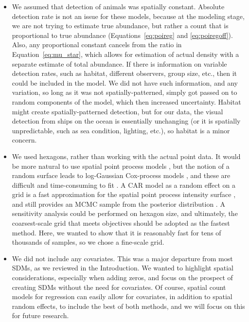 \documentclass[11pt, titlepage]{article}
\begin{document}
\begin{spacing}{1.9}
\begin{flushleft}
\begin{itemize}
  \item We assumed that detection of animals was spatially constant.  Absolute detection rate is not an issue for these models, because at the modeling stage, we are not trying to estimate true abundance, but rather a count that is proportional to true abundance (Equations~\eqref{eq:poireg} and \eqref{eq:poiregoff}).  Also, any proportional constant cancels from the ratio in Equation~\eqref{eq:mu_star}, which allows for estimation of actual density with a separate estimate of total abundance. If there is information on variable detection rates, such as habitat, different observers, group size, etc., then it could be included in the model.  We did not have such information, and any variation, so long as it was not spatially-patterned, simply got passed on to random components of the model, which then increased uncertainty.  Habitat might create spatially-patterned detection, but for our data, the visual detection from ships on the ocean is essentially unchanging (or it is spatially unpredictable, such as sea condition, lighting, etc.), so habitat is a minor concern. 
  \item We used hexagons, rather than working with the actual point data.  It would be more natural to use spatial point process models \citep{warton_poisson_2010, renner_equivalence_2013, renner_point_2015}, but the notion of a random surface leads to log-Gaussian Cox-process models \citep{moller_log_1998}, and these are difficult and time-consuming to fit \citep{teng_bayesian_2017}.  A CAR model as a random effect on a grid is a fast approximation for the spatial point process intensity surface \citep{rathbun_space-time_1994}, and still provides an MCMC sample from the posterior distribution \citep{besag_discussion_1994}.  A sensitivity analysis could be performed \citep[][p. 415]{kery_applied_2016} on hexagon size, and ultimately, the coarsest-scale grid that meets objectives should be adopted as the fastest method.  Here, we wanted to show that it is reasonably fast for tens of thousands of samples, so we chose a fine-scale grid.
  \item We did not include any covariates.  This was a major departure from most SDMs, as we reviewed in the Introduction.  We wanted to highlight spatial considerations, especially when adding zeros, and focus on the prospect of creating SDMs without the need for covariates.  Of course, spatial count models for regression can easily allow for covariates, in addition to spatial random effects, to include the best of both methods, and we will focus on this for future research.

\end{itemize}
\end{flushleft}
\end{spacing}
\end{document}
